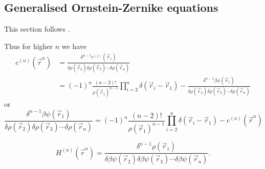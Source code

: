 \documentclass[12pt]{report}
\begin{document}
\subsection{Generalised Ornstein-Zernike equations}

This section follows \cite{Barrat1988}.

Thus for higher $n$ we have
\begin{equation}
  \begin{aligned}
    c^{(n)}(\vec{r}^n) &=
    \frac{\delta^{n-1} c^{(1)}(\vec{r}_1)}{\delta \rho(\vec{r}_2) \delta \rho(\vec{r}_3) \cdots \delta \rho(\vec{r}_n)} \\
    &=
    (-1)^n
    \frac{(n-2)!}{\rho(\vec{r}_1)^{n-1}}
    \prod_{i=2}^n \delta(\vec{r}_i - \vec{r}_1) -
    \frac{\delta^{n-1} \beta\psi(\vec{r}_1)}{\delta \rho(\vec{r}_2) \delta \rho(\vec{r}_3) \cdots \delta \rho(\vec{r}_n)}
  \end{aligned}
\end{equation}
or
\begin{equation}
  \frac{\delta^{n-1} \beta\psi(\vec{r}_1)}{\delta \rho(\vec{r}_2) \delta \rho(\vec{r}_3) \cdots \delta \rho(\vec{r}_n)} =
  (-1)^n
  \frac{(n-2)!}{\rho(\vec{r}_1)^{n-1}}
  \prod_{i=2}^n \delta(\vec{r}_i - \vec{r}_1) -
  c^{(n)}(\vec{r}^n)
\end{equation}

\begin{equation*}
  H^{(n)}(\vec{r}^n) =
  \frac{\delta^{n-1} \rho(\vec{r}_1)}{\delta \beta\psi(\vec{r}_2) \delta \beta\psi(\vec{r}_3) \cdots \delta \beta\psi(\vec{r}_n)}.
\end{equation*}
\end{document}

